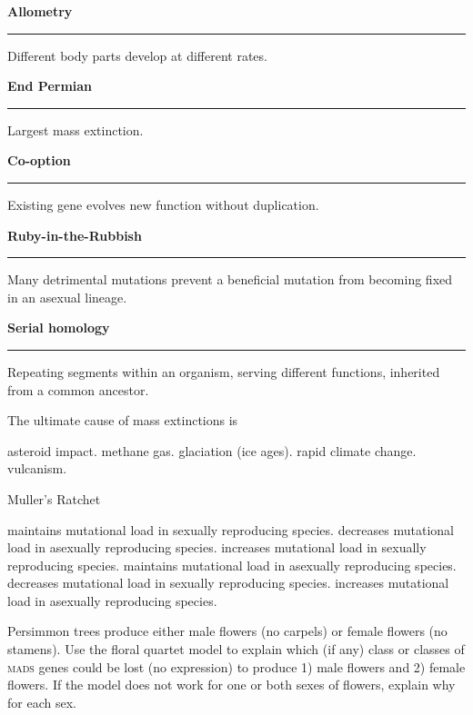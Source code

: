 \documentclass[12pt, addpoints]{exam}
\newcommand*\Matching[1]{
\ifprintanswers
	\textbf{#1}
\else
	\rule{2.1in}{0.5pt}
\fi
}
\newlength\matchlena
\newlength\matchlenb
\newcommand\MatchQuestion[2]{%
	\addtocounter{numpoints}{2}
	\setlength\matchlenb{\linewidth}
	\addtolength\matchlenb{-\matchlena}
	\parbox[t]{\matchlena}{\Matching{#1}}\enspace\parbox[t]{\matchlenb}{#2}}
\newcommand{\bumppoints}[1]{%
	\addtocounter{numpoints}{#1}
}
\begin{document}
\begin{questions}

\vspace{-1\baselineskip}
\fullwidth{%

}
\vspace{0.6\baselineskip}

\bumppoints{14}


\question\MatchQuestion{Allometry}{Different body parts develop at different rates.}\vspace{0.5\baselineskip}
%
\question\MatchQuestion{End Permian}{Largest mass extinction.}\vspace{0.5\baselineskip}
%
\question\MatchQuestion{Co-option}{Existing gene evolves new function without duplication.}\vspace{0.5\baselineskip}
%
\question\MatchQuestion{Ruby-in-the-Rubbish}{Many detrimental mutations prevent a beneficial mutation from becoming fixed in an asexual lineage.}\vspace{0.5\baselineskip}
%
\question\MatchQuestion{Serial homology}{Repeating segments within an organism, serving different functions, inherited from a common ancestor.}\vspace{0.5\baselineskip}

\bigskip


\question
The ultimate cause of mass extinctions is

\begin{choices}
\choice asteroid impact.
\choice methane gas.
\choice glaciation (ice ages).
\correctchoice rapid climate change.
\choice vulcanism.
\end{choices}


\question
Muller's Ratchet
\begin{choices}
	\choice maintains mutational load in sexually reproducing species.
	\choice decreases mutational load in asexually reproducing species.
	\choice increases mutational load in sexually reproducing species.
	\choice maintains mutational load in asexually reproducing species.
	\choice decreases mutational load in sexually reproducing species.
	\correctchoice increases mutational load in asexually reproducing species.
\end{choices}


\newpage


\question[10]
Persimmon trees produce either male flowers (no carpels) or female flowers (no stamens). Use the floral quartet model to explain which (if any) class or classes of \textsc{mads} genes could be lost (no expression) to produce 1) male flowers and 2) female flowers. If the model does not work for one or both sexes of flowers, explain why for each sex.


\end{questions}
\end{document}
